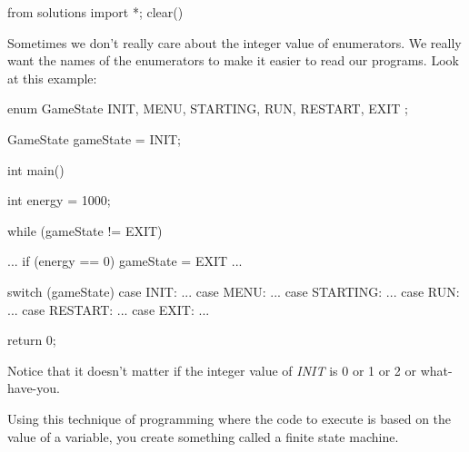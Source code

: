 \begin{python0}
from solutions import *; clear()
\end{python0}

Sometimes we don't really care about the integer value
of enumerators. We really want the names of the enumerators to make it
easier to read our programs. Look at this example:

\begin{consolethree}[escapeinside=||]
enum GameState
{
    INIT, MENU, STARTING, RUN, RESTART, EXIT
};

GameState gameState = INIT;

int main()
{
    int energy = 1000;

    while (gameState != EXIT)
    {
        ...
        if (energy == 0)
            gameState = EXIT
        ...

        switch (gameState)
        {
            case INIT: ...
            case MENU: ...
            case STARTING: ...
            case RUN: ...
            case RESTART: ...
            case EXIT: ...
        }
    }

    return 0;
}
\end{consolethree}

Notice that it doesn't matter if the integer value of
\textit{INIT} is 0 or 1 or 2 or what-have-you.

Using this technique of programming where the code to execute is based
on the value of a variable, you create something called a finite state
machine.




